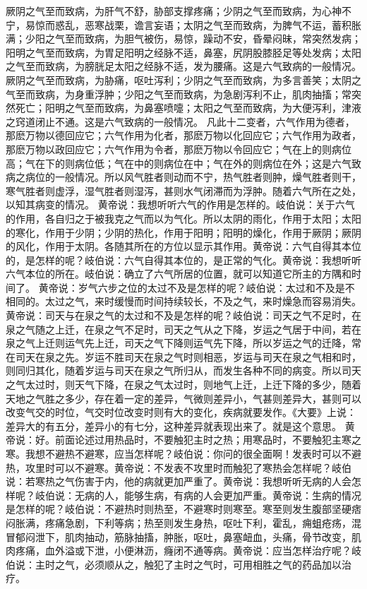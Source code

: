 \documentclass[a4paper,12pt,UTF8,twoside]{ctexbook}
\begin{document}
厥阴之气至而致病，为肝气不舒，胁部支撑疼痛；少阴之气至而致病，为心神不宁，易惊而惑乱，恶寒战栗，谵言妄语；太阴之气至而致病，为脾气不运，蓄积胀满；少阳之气至而致病，为胆气被伤，易惊，躁动不安，昏晕闷昧，常突然发病；阳明之气至而致病，为胃足阳明之经脉不适，鼻塞，尻阴股膝胫足等处发病；太阳之气至而致病，为膀胱足太阳之经脉不适，发为腰痛。这是六气致病的一般情况。
厥阴之气至而致病，为胁痛，呕吐泻利；少阴之气至而致病，为多言善笑；太阴之气至而致病，为身重浮肿；少阳之气至而致病，为急剧泻利不止，肌肉抽搐；常突然死亡；阳明之气至而致病，为鼻塞喷嚏；太阳之气至而致病，为大便泻利，津液之窍道闭止不通。这是六气致病的一般情况。
凡此十二变者，六气作用为德者，那麽万物以德回应它；六气作用为化者，那麽万物以化回应它；六气作用为政者，那麽万物以政回应它；六气作用为令者，那麽万物以令回应它；气在上的则病位高；气在下的则病位低；气在中的则病位在中；气在外的则病位在外；这是六气致病之病位的一般情况。所以风气胜者则动而不宁，热气胜者则肿，燥气胜者则干，寒气胜者则虚浮，湿气胜者则湿泻，甚则水气闭滞而为浮肿。随着六气所在之处，以知其病变的情况。
黄帝说：我想听听六气的作用是怎样的。岐伯说：关于六气的作用，各自归之于被我克之气而以为气化。所以太阴的雨化，作用于太阳；太阳的寒化，作用于少阴；少阴的热化，作用于阳明；阳明的燥化，作用于厥阴；厥阴的风化，作用于太阴。各随其所在的方位以显示其作用。黄帝说：六气自得其本位的，是怎样的呢？岐伯说：六气自得其本位的，是正常的气化。黄帝说：我想听听六气本位的所在。岐伯说：确立了六气所居的位置，就可以知道它所主的方隅和时间了。
黄帝说：岁气六步之位的太过不及是怎样的呢？岐伯说：太过和不及是不相同的。太过之气，来时缓慢而时间持续较长，不及之气，来时燥急而容易消失。黄帝说：司天与在泉之气的太过和不及是怎样的呢？岐伯说：司天之气不足时，在泉之气随之上迁，在泉之气不足时，司天之气从之下降，岁运之气居于中间，若在泉之气上迁则运气先上迁，司天之气下降则运气先下降，所以岁运之气的迁降，常在司天在泉之先。岁运不胜司天在泉之气时则相恶，岁运与司天在泉之气相和时，则同归其化，随着岁运与司天在泉之气所归从，而发生各种不同的病变。所以司天之气太过时，则天气下降，在泉之气太过时，则地气上迁，上迁下降的多少，随着天地之气胜之多少，存在着一定的差异，气微则差异小，气甚则差异大，甚则可以改变气交的时位，气交时位改变时则有大的变化，疾病就要发作。《大要》上说：差异大的有五分，差异小的有七分，这种差异就表现出来了。就是这个意思。
黄帝说：好。前面论述过用热品时，不要触犯主时之热；用寒品时，不要触犯主寒之寒。我想不避热不避寒，应当怎样呢？岐伯说：你问的很全面啊！发表时可以不避热，攻里时可以不避寒。黄帝说：不发表不攻里时而触犯了寒热会怎样呢？岐伯说：若寒热之气伤害于内，他的病就更加严重了。黄帝说：我想听听无病的人会怎样呢？岐伯说：无病的人，能够生病，有病的人会更加严重。黄帝说：生病的情况是怎样的呢？岐伯说：不避热时则热至，不避寒时则寒至。寒至则发生腹部坚硬痞闷胀满，疼痛急剧，下利等病；热至则发生身热，呕吐下利，霍乱，痈蛆疮疡，混冒郁闷泄下，肌肉抽动，筋脉抽搐，肿胀，呕吐，鼻塞衄血，头痛，骨节改变，肌肉疼痛，血外溢或下泄，小便淋沥，癃闭不通等病。黄帝说：应当怎样治疗呢？岐伯说：主时之气，必须顺从之，触犯了主时之气时，可用相胜之气的药品加以治疗。
\end{document}
